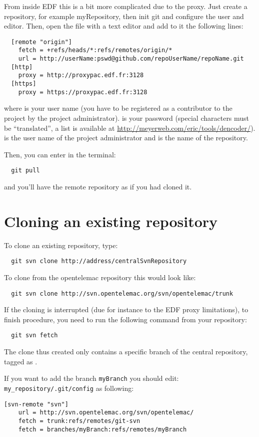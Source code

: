 From inside EDF this is a bit more complicated due to the proxy.
Just create a repository, for example myRepository, then init git and configure the user and editor.
Then, open the file  with a text editor and add to it the following lines:
\begin{lstlisting}
  [remote "origin"]
    fetch = +refs/heads/*:refs/remotes/origin/*
    url = http://userName:pswd@github.com/repoUserName/repoName.git
  [http]
    proxy = http://proxypac.edf.fr:3128
  [https]
    proxy = https://proxypac.edf.fr:3128
\end{lstlisting}
where  is your  user name (you have to be registered as a contributor to the project by the project administrator).
 is your  password (special characters must be ``translated'', a list is available at \url{http://meyerweb.com/eric/tools/dencoder/}).
 is the  user name of the project administrator and  is the name of the repository.

Then, you can enter in the terminal:
\begin{lstlisting}
  git pull
\end{lstlisting}
and you'll have the remote repository as if you had cloned it.

\section{Cloning an existing  repository}

To clone an existing  repository, type:
\begin{lstlisting}
  git svn clone http://address/centralSvnRepository
\end{lstlisting}%
To clone from the opentelemac repository this would look like:
\begin{lstlisting}
  git svn clone http://svn.opentelemac.org/svn/opentelemac/trunk
\end{lstlisting}
If the cloning is interrupted (due for instance to the EDF proxy limitations), to finish procedure, you need to run the following command from your repository:
\begin{lstlisting}
  git svn fetch
\end{lstlisting}
The clone thus created only contains a specific branch of the central  repository, tagged as .

If you want to add the  branch \verb"myBranch" you should edit: \verb"my_repository/.git/config" as following:
\begin{lstlisting}
[svn-remote "svn"]
	url = http://svn.opentelemac.org/svn/opentelemac/
	fetch = trunk:refs/remotes/git-svn
	fetch = branches/myBranch:refs/remotes/myBranch
\end{lstlisting}

